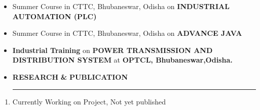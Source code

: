 \documentclass[a4paper]{article}
\begin{document}
 \renewcommand{\labelitemi}{\textbullet}
 \begin{itemize}
   \item Summer Course in CTTC, Bhubaneswar, Odisha on \textbf{INDUSTRIAL AUTOMATION (PLC)}
   \item Summer Course in CTTC, Bhubaneswar, Odisha on \textbf{ADVANCE JAVA}
   \item \textbf{Industrial Training} on \textbf{POWER TRANSMISSION AND DISTRIBUTION SYSTEM} at \textbf{OPTCL, Bhubaneswar,Odisha.}  
 \end{itemize}

 \renewcommand{\labelitemi}{\texttt{[image: jnj.JPG]}}
\begin{itemize}
  \vspace{4ex}
  \item \textbf{\huge{R}}\textbf{\large ESEARCH} \textbf{\LARGE{\&}} \textbf{\huge{P}}\textbf{\large UBLICATION}
  {\color{mypink1}
  \rule{8.5cm}{0.5mm}}
 \end{itemize}
 \begin{enumerate}
     \item Currently Working on Project, Not yet published
 \end{enumerate}
 
\end{document}
